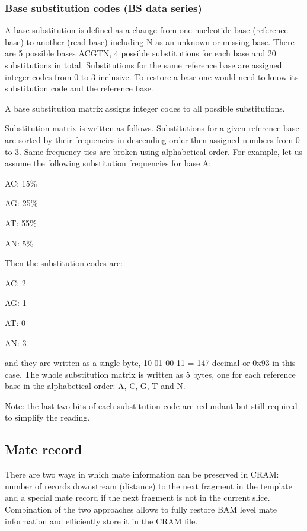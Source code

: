 \documentclass[a4paper]{article}
\begin{document}
\subsubsection*{Base substitution codes (BS data series)}

A base substitution is defined as a change from one nucleotide base (reference 
base) to another (read base) including N as an unknown or missing base. There are 
5 possible bases ACGTN, 4 possible substitutions for each base and 20 substitutions 
in total. Substitutions for the same reference base are assigned integer codes 
from 0 to 3 inclusive. To restore a base one would need to know its substitution 
code and the reference base. 

A base substitution matrix assigns integer codes to all possible substitutions. 

Substitution matrix is written as follows. Substitutions for a given reference 
base are sorted by their frequencies in descending order then assigned numbers 
from 0 to 3. Same-frequency ties are broken using alphabetical order. For example, 
let us assume the following substitution frequencies for base A: 

AC: 15\%

AG: 25\%

AT: 55\%

AN: 5\%

Then the substitution codes are: 

AC: 2

AG: 1

AT: 0

AN: 3

and they are written as a single byte, 10 01 00 11 = 147 decimal or 0x93 in this 
case. The whole substitution matrix is written as 5 bytes, one for each reference 
base in the alphabetical order: A, C, G, T and N.

Note: the last two bits of each substitution code are redundant but still required 
to simplify the reading. 

\subsection{\textbf{Mate record}}

There are two ways in which mate information can be preserved in CRAM: number of 
records downstream (distance) to the next fragment in the template and a special 
mate record if the next fragment is not in the current slice. Combination of the 
two approaches allows to fully restore BAM level mate information and efficiently 
store it in the CRAM file. 
\end{document}
